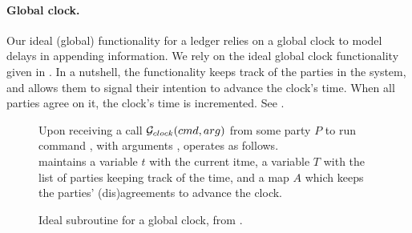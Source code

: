 \paragraph{Global clock.} %
Our ideal (global) functionality for a ledger relies on a global clock to model
delays in appending information. We rely on the ideal global clock functionality
given in \cite{kkk21}. In a nutshell, the functionality keeps track of the
parties in the system, and allows them to signal their intention to advance the
clock's time. When all parties agree on it, the clock's time is incremented. See
.

\begin{figure}[ht]
  \begin{framed}
    \begin{minipage}[t]{\textwidth}
      \textrm{Upon receiving a call $\mathcal{G}_{clock}(cmd,arg)$ from
        some party $P$ to run command \cmd, with arguments \arg,
        \IdealGclock operates as follows.} \\
      \textrm{\IdealGclock maintains a variable $t$ with the current itme,
        a variable $T$ with the list of parties keeping track of the time,
        and a map $A$ which keeps the parties' (dis)agreements to advance the
        clock.}
    \end{minipage}
    \vspace*{0.5em}

    \begin{minipage}[t]{0.40\textwidth}
    \end{minipage}
    \hspace*{1.25em}
    \begin{minipage}[t]{0.60\textwidth}
    \end{minipage}
  \end{framed}
  \caption{Ideal subroutine for a global clock, from \cite{kkk21}.}
  \label{fig:gclock}
\end{figure}

